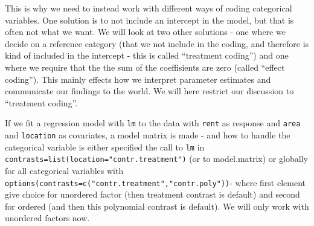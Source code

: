 \documentclass[10pt,ignorenonframetext,]{beamer}
\begin{document}
\begin{frame}

This is why we need to instead work with different ways of coding
categorical variables. One solution is to not include an intercept in
the model, but that is often not what we want. We will look at two other
solutions - one where we decide on a reference category (that we not
include in the coding, and therefore is kind of included in the
intercept - this is called ``treatment coding'') and one where we
require that the the sum of the coeffisients are zero (called ``effect
coding''). This mainly effects how we interpret parameter estimates and
communicate our findings to the world. We will here restrict our
discussion to ``treatment coding''.

\end{frame}

\begin{frame}[fragile]

If we fit a regression model with \texttt{lm} to the data with
\texttt{rent} as response and \texttt{area} and \texttt{location} as
covariates, a model matrix is made - and how to handle the categorical
variable is either specified the call to \texttt{lm} in
\texttt{contrasts=list(location="contr.treatment")} (or to model.matrix)
or globally for all categorical variables with
\texttt{options(contrasts=c("contr.treatment","contr.poly"))}- where
first element give choice for unordered factor (then treatment contrast
is default) and second for ordered (and then this polynomial contrast is
default). We will only work with unordered factors now.

\end{frame}
\end{document}
